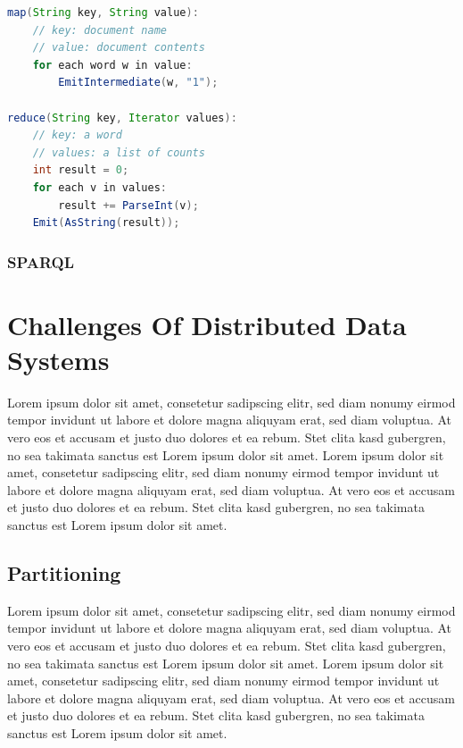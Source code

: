 {\begin{lstlisting}[aboveskip=1ex, belowskip=1ex, xleftmargin=18pt, emphstyle=\underbar, breaklines=true, showstringspaces=false, captionpos=b, caption=MapReduce Example - Word Count, label=min_mapreduce, float,language=java]
map(String key, String value):
	// key: document name
	// value: document contents
	for each word w in value:
		EmitIntermediate(w, "1");

reduce(String key, Iterator values):
	// key: a word
	// values: a list of counts
	int result = 0;
	for each v in values:
		result += ParseInt(v);
	Emit(AsString(result));
\end{lstlisting}


\subsubsection{SPARQL}
\label{tf_dma_dataaccess_sparql}

\section{Challenges Of Distributed Data Systems}
\label{tf_dds}
Lorem ipsum dolor sit amet, consetetur sadipscing elitr, sed diam nonumy eirmod tempor invidunt ut labore et dolore magna aliquyam erat, sed diam voluptua. At vero eos et accusam et justo duo dolores et ea rebum. Stet clita kasd gubergren, no sea takimata sanctus est Lorem ipsum dolor sit amet. Lorem ipsum dolor sit amet, consetetur sadipscing elitr, sed diam nonumy eirmod tempor invidunt ut labore et dolore magna aliquyam erat, sed diam voluptua. At vero eos et accusam et justo duo dolores et ea rebum. Stet clita kasd gubergren, no sea takimata sanctus est Lorem ipsum dolor sit amet.

	\subsection{Partitioning}
	\label{tf_dds_partitioning}
	Lorem ipsum dolor sit amet, consetetur sadipscing elitr, sed diam nonumy eirmod tempor invidunt ut labore et dolore magna aliquyam erat, sed diam voluptua. At vero eos et accusam et justo duo dolores et ea rebum. Stet clita kasd gubergren, no sea takimata sanctus est Lorem ipsum dolor sit amet. Lorem ipsum dolor sit amet, consetetur sadipscing elitr, sed diam nonumy eirmod tempor invidunt ut labore et dolore magna aliquyam erat, sed diam voluptua. At vero eos et accusam et justo duo dolores et ea rebum. Stet clita kasd gubergren, no sea takimata sanctus est Lorem ipsum dolor sit amet.

}

